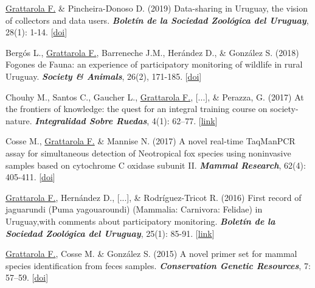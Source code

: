 \documentclass[9pt]{developercv} %
\begin{document}
\begin{etaremune}
\item \underline{Grattarola F.} \& Pincheira-Donoso D. (2019) Data-sharing in Uruguay, the vision of collectors and data users. \textit{\textbf{Boletín de la Sociedad Zoológica del Uruguay}}, 28(1): 1-14. [\href{https://doi.org/10.26462/28.1.1}{doi}]

\item Bergós L., \underline{Grattarola F.}, Barreneche J.M., Herández D., \& González S. (2018) Fogones de Fauna: an experience of participatory monitoring of wildlife in rural Uruguay. \textit{\textbf{Society \& Animals}}, 26(2), 171-185. [\href{https://doi.org/10.1163/15685306-12341497}{doi}]

\item Chouhy M., Santos C., Gaucher L., \underline{Grattarola F.}, [...], \& Perazza, G. (2017) At the frontiers of knowledge: the quest for an integral training course on society-nature. \textit{\textbf{Integralidad Sobre Ruedas}}, 4(1): 62–77. [\href{https://ojs.fhce.edu.uy/index.php/insoru/article/view/234}{link}]

\item Cosse M., \underline{Grattarola F.}  \& Mannise N. (2017) A novel real-time TaqMan\texttrademark PCR assay for simultaneous detection of Neotropical fox species using noninvasive samples based on cytochrome C oxidase subunit II. \textit{\textbf{Mammal Research}}, 62(4): 405-411. [\href{https://doi.org/10.1007/s13364-017-0328-y}{doi}]

\item \underline{Grattarola F.}, Hernández D., [...], \& Rodríguez-Tricot R. (2016) First record of jaguarundi (Puma yagouaroundi) (Mammalia: Carnivora: Felidae) in Uruguay,with comments about  participatory monitoring. \textit{\textbf{Boletín de la Sociedad Zoológica del Uruguay}}, 25(1): 85-91. [\href{http://szu.org.uy/journal/index.php/Bol_SZU/article/view/23}{link}]

\item \underline{Grattarola F.}, Cosse M. \& González S. (2015) A novel primer set for mammal species identification from feces samples. \textit{\textbf{Conservation Genetic Resources}}, 7: 57–59. [\href{https://doi.org/10.1007/s12686-014-0359-5}{doi}]

\end{etaremune}


\end{document}
